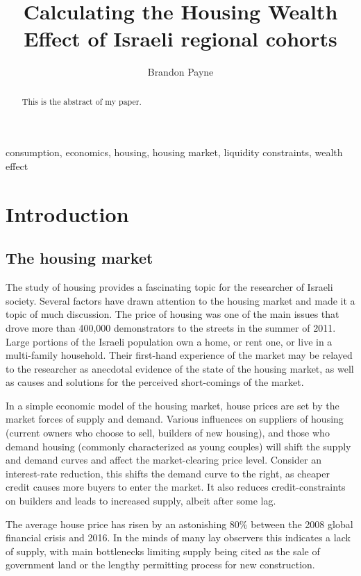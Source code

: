 \documentclass[12pt,a4paper,]{article}
\title{Calculating the Housing Wealth Effect of Israeli regional cohorts}
\author{Brandon Payne}
\date{}
\begin{document}
\maketitle

\begin{abstract}
This is the abstract of my paper.
\end{abstract}

\begin{keywords}
 consumption, economics, housing, housing market, liquidity constraints, wealth effect 
\end{keywords}

\newpage

\section{Introduction}\label{introduction}

\subsection{The housing market}\label{the-housing-market}

The study of housing provides a fascinating topic for the researcher of
Israeli society. Several factors have drawn attention to the housing
market and made it a topic of much discussion. The price of housing was
one of the main issues that drove more than 400,000 demonstrators to the
streets in the summer of 2011. Large portions of the Israeli population
own a home, or rent one, or live in a multi-family household. Their
first-hand experience of the market may be relayed to the researcher as
anecdotal evidence of the state of the housing market, as well as causes
and solutions for the perceived short-comings of the market.

In a simple economic model of the housing market, house prices are set
by the market forces of supply and demand. Various influences on
suppliers of housing (current owners who choose to sell, builders of new
housing), and those who demand housing (commonly characterized as young
couples) will shift the supply and demand curves and affect the
market-clearing price level. Consider an interest-rate reduction, this
shifts the demand curve to the right, as cheaper credit causes more
buyers to enter the market. It also reduces credit-constraints on
builders and leads to increased supply, albeit after some lag.

The average house price has risen by an astonishing 80\% between the
2008 global financial crisis and 2016. In the minds of many lay
observers this indicates a lack of supply, with main bottlenecks
limiting supply being cited as the sale of government land or the
lengthy permitting process for new construction.
\end{document}
